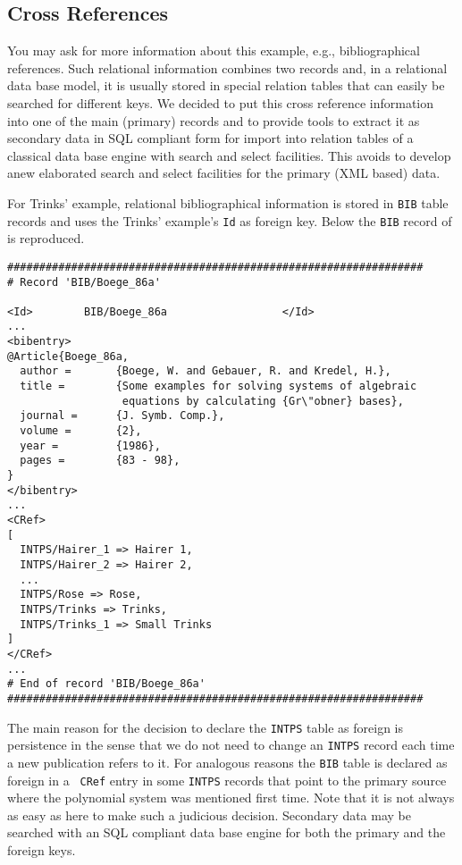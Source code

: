 \documentclass[11pt]{article}
\begin{document}
\subsection{Cross References}

You may ask for more information about this example, e.g.,
bibliographical references. Such relational information combines two
records and, in a relational data base model, it is usually stored in
special relation tables that can easily be searched for different
keys.  We decided to put this cross reference information into one of
the main (primary) records and to provide tools to extract it as
secondary data in SQL compliant form for import into relation tables
of a classical data base engine with search and select facilities.
This avoids to develop anew elaborated search and select facilities
for the primary (XML based) data.

For Trinks' example, relational bibliographical information is stored
in {\tt BIB} table records and uses the Trinks' example's {\tt Id} as
foreign key.  Below the {\tt BIB} record of \cite{Boege_86a} is
reproduced.

\begin{table}[ht]
{\small\begin{verbatim}
#################################################################
# Record 'BIB/Boege_86a'

<Id>        BIB/Boege_86a                  </Id>
...
<bibentry>
@Article{Boege_86a,
  author =       {Boege, W. and Gebauer, R. and Kredel, H.},
  title =        {Some examples for solving systems of algebraic
                  equations by calculating {Gr\"obner} bases},
  journal =      {J. Symb. Comp.},
  volume =       {2},
  year =         {1986},
  pages =        {83 - 98},
}
</bibentry>
...
<CRef>
[
  INTPS/Hairer_1 => Hairer 1,
  INTPS/Hairer_2 => Hairer 2,
  ...
  INTPS/Rose => Rose,
  INTPS/Trinks => Trinks,
  INTPS/Trinks_1 => Small Trinks
]
</CRef>
...
# End of record 'BIB/Boege_86a'
#################################################################
\end{verbatim}}
\end{table}

The main reason for the decision to declare the {\tt INTPS} table as
foreign is persistence in the sense that we do not need to change an
{\tt INTPS} record each time a new publication refers to it.  For
analogous reasons the {\tt BIB} table is declared as foreign in a {\tt
CRef} entry in some {\tt INTPS} records that point to the primary
source where the polynomial system was mentioned first time.  Note
that it is not always as easy as here to make such a judicious
decision.  Secondary data may be searched with an SQL compliant data
base engine for both the primary and the foreign keys.
\end{document}

